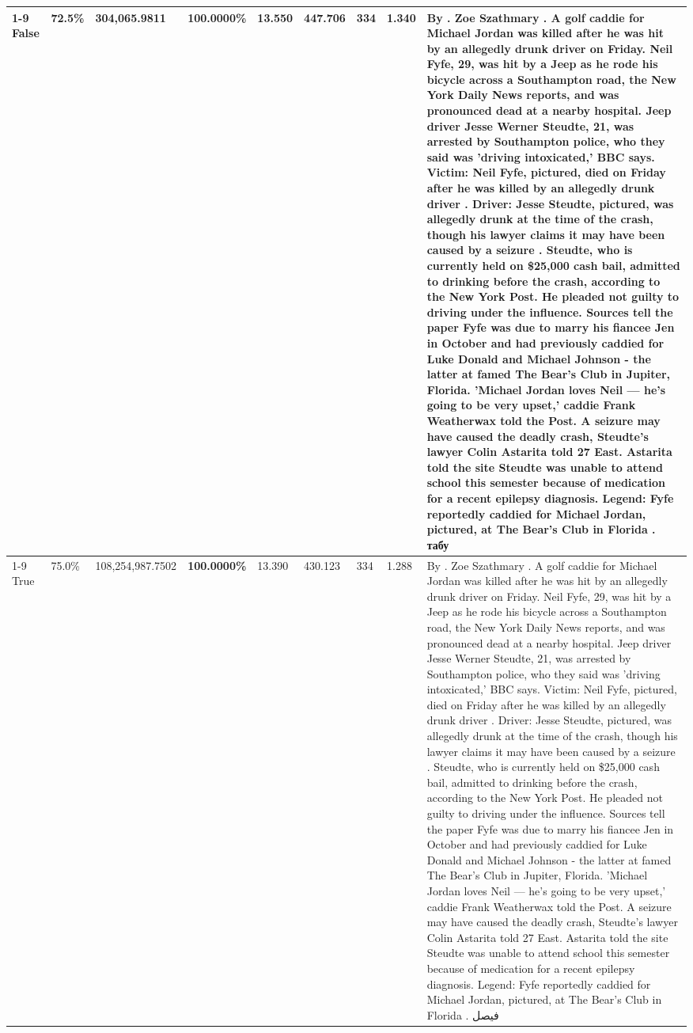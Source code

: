\begin{table}[H]
\begin{tabular}{lllrlllll}
\cline{1-9}
False & 72.5\% & 304,065.9811 & \bfseries \color{red} 100.0000\% & 13.550 & 447.706 & 334 & 1.340 & By . Zoe Szathmary . A golf caddie for Michael Jordan was killed after he was hit by an allegedly drunk driver on Friday. Neil Fyfe, 29, was hit by a Jeep as he rode his bicycle across a Southampton road, the New York Daily News reports, and was pronounced dead at a nearby hospital. Jeep driver Jesse Werner Steudte, 21, was arrested by Southampton police, who they said was 'driving intoxicated,' BBC says. Victim: Neil Fyfe, pictured, died on Friday after he was killed by an allegedly drunk driver . Driver: Jesse Steudte, pictured, was allegedly drunk at the time of the crash, though his lawyer claims it may have been caused by a seizure . Steudte, who is currently held on \$25,000 cash bail, admitted to drinking before the crash, according to the New York Post. He pleaded not guilty to driving under the influence. Sources tell the paper Fyfe was due to marry his fiancee Jen in October and had previously caddied for Luke Donald and Michael Johnson - the latter at famed The Bear's Club in Jupiter, Florida. 'Michael Jordan loves Neil — he’s going to be very upset,' caddie Frank Weatherwax told the Post. A seizure may have caused the deadly crash, Steudte's lawyer Colin Astarita told 27 East. Astarita told the site Steudte was unable to attend school this semester because of medication for a recent epilepsy diagnosis. Legend: Fyfe reportedly caddied for Michael Jordan, pictured, at The Bear's Club in Florida . табу \\
\cline{1-9}
True & 75.0\% & 108,254,987.7502 & \bfseries \color{red} 100.0000\% & 13.390 & 430.123 & 334 & 1.288 & By . Zoe Szathmary . A golf caddie for Michael Jordan was killed after he was hit by an allegedly drunk driver on Friday. Neil Fyfe, 29, was hit by a Jeep as he rode his bicycle across a Southampton road, the New York Daily News reports, and was pronounced dead at a nearby hospital. Jeep driver Jesse Werner Steudte, 21, was arrested by Southampton police, who they said was 'driving intoxicated,' BBC says. Victim: Neil Fyfe, pictured, died on Friday after he was killed by an allegedly drunk driver . Driver: Jesse Steudte, pictured, was allegedly drunk at the time of the crash, though his lawyer claims it may have been caused by a seizure . Steudte, who is currently held on \$25,000 cash bail, admitted to drinking before the crash, according to the New York Post. He pleaded not guilty to driving under the influence. Sources tell the paper Fyfe was due to marry his fiancee Jen in October and had previously caddied for Luke Donald and Michael Johnson - the latter at famed The Bear's Club in Jupiter, Florida. 'Michael Jordan loves Neil — he’s going to be very upset,' caddie Frank Weatherwax told the Post. A seizure may have caused the deadly crash, Steudte's lawyer Colin Astarita told 27 East. Astarita told the site Steudte was unable to attend school this semester because of medication for a recent epilepsy diagnosis. Legend: Fyfe reportedly caddied for Michael Jordan, pictured, at The Bear's Club in Florida . فیصل \\

\end{tabular}
\end{table}
